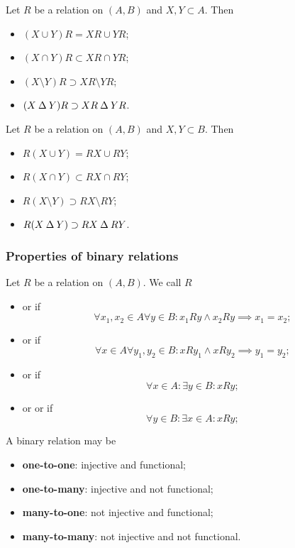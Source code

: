\begin{lemma} \label{lemma:imageRelation}
Let $R$ be a relation on $(A, B)$ and $X,Y\subset A$. Then
\begin{itemize}
\item $(X\cup Y)R = XR\cup YR$;
\item $(X\cap Y)R \subset XR\cap YR$;
\item $(X\setminus Y)R \supset XR\setminus YR$;
\item $(X\mathbin{\Delta} Y)R \supset XR\mathbin{\Delta} YR$.
\end{itemize}
\end{lemma}
\begin{lemma} \label{lemma:preimageRelation}
Let $R$ be a relation on $(A, B)$ and $X,Y\subset B$. Then
\begin{itemize}
\item $R(X\cup Y) = RX\cup RY$;
\item $R(X\cap Y) \subset RX\cap RY$;
\item $R(X\setminus Y) \supset RX\setminus RY$;
\item $R(X\mathbin{\Delta} Y) \supset RX\mathbin{\Delta} RY$.
\end{itemize}
\end{lemma}

\subsubsection{Properties of binary relations}
\begin{definition}
Let $R$ be a relation on $(A, B)$. We call $R$
\begin{itemize}
\item {} or  if
\[ \forall x_1,x_2\in A\forall y\in B: x_1Ry \land x_2Ry \implies x_1=x_2; \]
\item {} or  if
\[ \forall x\in A\forall y_1,y_2\in B: xRy_1 \land xRy_2 \implies y_1=y_2; \]
\item {} or  if
\[ \forall x\in A:\exists y\in B: xRy; \]
\item {} or  or  if
\[ \forall y\in B:\exists x\in A: xRy; \]
\end{itemize}
\end{definition}
A binary relation may be
\begin{itemize}
\item \textbf{one-to-one}: injective and functional;
\item \textbf{one-to-many}: injective and not functional;
\item \textbf{many-to-one}: not injective and functional;
\item \textbf{many-to-many}: not injective and not functional.
\end{itemize}

